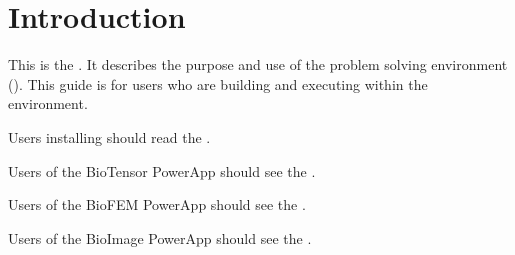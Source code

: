%
% 
% 
% 
%  
% 
% 
%


%

\chapter{Introduction}
\label{ch:intro}

This is the \etitle{\srug}.  It describes the purpose and use of the
\sr{} problem solving environment (\pse).  This guide is for users who
are building and executing  within the \sr{}
environment.

Users installing \sr{} should read the
.

Users of the BioTensor PowerApp should see the
.

Users of the BioFEM PowerApp should see the
.

Users of the BioImage PowerApp should see the
.

